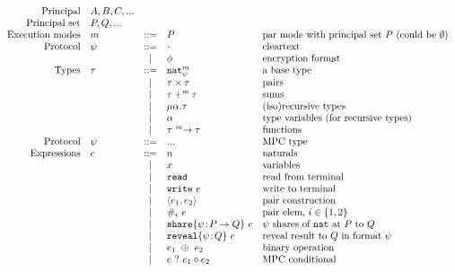 \documentclass[10pt]{article}
\newcommand{\kw}[1]{\ensuremath{\mathtt{#1}}}
\newcommand{\tnat}{\ensuremath{\mathtt{nat}}}
\newcommand{\tfun}[3]{\ensuremath{{#1} ~^{#3}\!\!\rightarrow {#2}}}
\newcommand{\tpair}[2]{\ensuremath{{#1} \times {#2}}}
\newcommand{\tsum}[3]{\ensuremath{{#1} +^{#3} {#2}}}
\newcommand{\trec}[2]{\ensuremath{\mu {#1}.{#2}}}
\newcommand{\ebinop}[2]{\ensuremath{{#1}~\oplus~{#2}}}
\newcommand{\ereveal}[3]{\ensuremath{\kw{reveal}\{{#1}\!:\!{#2}\}~{#3}}}
\newcommand{\emux}[3]{\ensuremath{{#1}~\kw{?}~{#2} \diamond {#3}}}
\newcommand{\eshare}[4]{\ensuremath{\kw{share}\{{#1}\!:\!{#2}\rightarrow{#3}\}~{#4}}}
\newcommand{\eread}{\ensuremath{\kw{read}}}
\newcommand{\ewrite}[1]{\ensuremath{\kw{write}~{#1}}}
\newcommand{\epair}[2]{\ensuremath{\langle {#1}, {#2} \rangle}}
\newcommand{\eproj}[2]{\ensuremath{\kw{\#}}_{#1}~{#2}}
\begin{document}
\begin{figure}[h]
  \centering
  \[\begin{array}{rlcll}
      \text{Principal} & A, B, C, ... \\
      \text{Principal set} & P, Q, ... \\
    \text{Execution modes} & m  & ::=  & P & \text{par mode with principal set $P$ (could be $\emptyset$)} \\
      \text{Protocol} & \psi & ::= & \cdot & \text{cleartext} \\
                       && \mid & \phi & \text{encryption format} \\
      \text{Types} & \tau & ::=  & \tnat^m_\psi & \text{a base type} \\
                       && \mid & \tpair{\tau}{\tau} & \text{pairs} \\
                       && \mid & \tsum{\tau}{\tau}{m} & \text{sums} \\
                       && \mid & \trec{\alpha}{\tau} & \text{(iso)recursive types} \\
                       && \mid & \alpha & \text{type variables (for recursive types)} \\
                       && \mid & \tfun{\tau}{\tau}{m} & \text{functions} \\
      \text{Protocol} & \psi & ::= & ... & \text{MPC type} \\
      \text{Expressions} & e & ::= & n & \text{naturals} \\
                       && \mid & x & \text{variables} \\
                       && \mid & \eread & \text{read from terminal}\\
                       && \mid & \ewrite{e} & \text{write to terminal}\\
                       && \mid & \epair{e_1}{e_2} & \text{pair construction}\\
                       && \mid & \eproj{i}{e} & \text{pair elem, }i \in \{1,2\}\\
                       && \mid & \eshare{\psi}{P}{Q}{e} & \text{$\psi$ shares of {\tnat} at $P$ to $Q$} \\
                       && \mid & \ereveal{\psi}{Q}{e} & \text{reveal result to $Q$ in format $\psi$}\\
                       && \mid & \ebinop{e_1}{e_2}  & \text{binary operation} \\
                       && \mid & \emux{e}{e_1}{e_2}  & \text{MPC conditional} \\

\end{array}\]
\end{figure}
\end{document}
